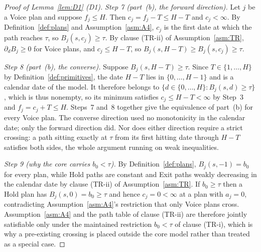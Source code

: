 \begin{proof}[Proof of Lemma~\ref{lem:D1} (D1)]
\emph{Step 7 (part~(b), the forward direction).} Let $j$ be a Voice plan and suppose $f_j \le H$.
Then $c_j = f_j - T \le H-T$ and $c_j < \infty$. By Definition~\ref{def:plans} and
Assumption~\ref{asm:A4}, $c_j$ is the first date at which the path reaches $\tau$, so
$B_j(s,c_j) \ge \tau$. By clause (TR-ii) of Assumption~\ref{asm:TR}, $\partial_d B_j \ge 0$ for
Voice plans, and $c_j \le H-T$, so $B_j(s,H-T) \ge B_j(s,c_j) \ge \tau$.

\emph{Step 8 (part~(b), the converse).} Suppose $B_j(s,H-T) \ge \tau$. Since
$T \in \{1,\dots,H\}$ by Definition~\ref{def:primitives}, the date $H-T$ lies in $\{0,\dots,H-1\}$
and is a calendar date of the model. It therefore belongs to
$\{d \in \{0,\dots,H\} : B_j(s,d) \ge \tau\}$, which is thus nonempty, so its minimum satisfies
$c_j \le H-T < \infty$ by Step~3 and $f_j = c_j+T \le H$. Steps~7 and~8 together give the equivalence
of part~(b) for every Voice plan. The converse direction used no monotonicity in the calendar date;
only the forward direction did. Nor does either direction require a strict crossing: a path sitting
exactly at $\tau$ from its first hitting date through $H-T$ satisfies both sides, the whole argument
running on weak inequalities.

\emph{Step 9 (why the core carries $b_0 < \tau$).} By Definition~\ref{def:plans},
$B_j(s,-1) = b_0$ for every plan, while Hold paths are constant and Exit paths weakly decreasing in
the calendar date by clause (TR-ii) of Assumption~\ref{asm:TR}. If $b_0 \ge \tau$ then a Hold plan
has $B_j(s,0) = b_0 \ge \tau$ and hence $c_j = 0 < \infty$ at a plan with $a_j = 0$, contradicting
Assumption~\ref{asm:A4}'s restriction that only Voice plans cross. Assumption~\ref{asm:A4} and the
path table of clause (TR-ii) are therefore jointly satisfiable only under the maintained restriction
$b_0 < \tau$ of clause (TR-i), which is why a pre-existing crossing is placed outside the core model
rather than treated as a special case.


\end{proof}
